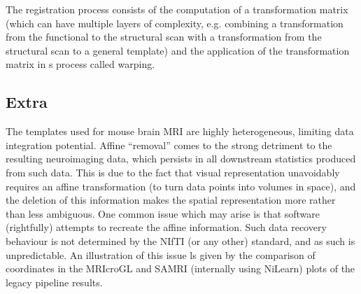The registration process consists of the computation of a transformation matrix (which can have multiple layers of complexity, e.g. combining a transformation from the functional to the structural scan with a transformation from the structural scan to a general template) and the application of the transformation matrix in s process called warping.

	\subsection{Extra}
	The templates used for mouse brain MRI are highly heterogeneous, limiting data integration potential.
	Affine “removal” comes to the strong detriment to the resulting neuroimaging data, which persists in all downstream statistics produced from such data.
	This is due to the fact that visual representation unavoidably requires an affine transformation (to turn data points into volumes in space), and the deletion of this information makes the spatial representation more rather than less ambiguous.
	One common issue which may arise is that software (rightfully) attempts to recreate the affine information.
	Such data recovery behaviour is not determined by the NIfTI (or any other) standard, and as such is unpredictable.
	An illustration of this issue ls given by the comparison of coordinates in the MRIcroGL and SAMRI (internally using NiLearn) plots of the legacy pipeline results.
	
